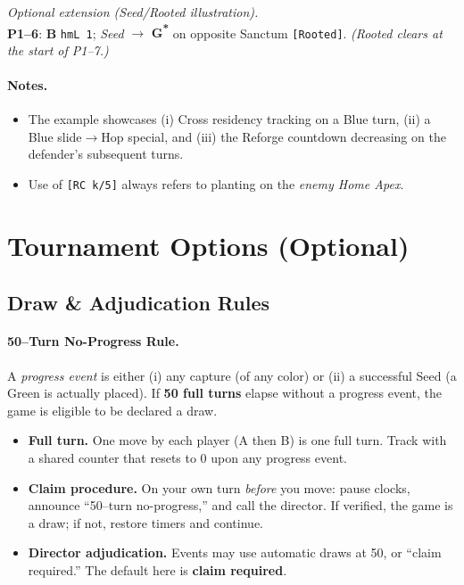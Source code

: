 \documentclass[11pt]{article}
\begin{document}
\noindent\emph{Optional extension (Seed/Rooted illustration).}\\
\textbf{P1--6}: \textbf{B} \texttt{hmL 1}; \emph{Seed} $\rightarrow$ \textbf{G\textsuperscript{*}} on opposite Sanctum \texttt{[Rooted]}. \emph{(Rooted clears at the start of P1--7.)}

\paragraph{Notes.}
\begin{itemize}
  \item The example showcases (i) Cross residency tracking on a Blue turn, (ii) a Blue slide$\rightarrow$Hop special, and (iii) the Reforge countdown decreasing on the defender's subsequent turns.
  \item Use of \texttt{[RC k/5]} always refers to planting on the \emph{enemy Home Apex}.
\end{itemize}

\section{Tournament Options (Optional)}
\label{sec:tournament-options}

\subsection{Draw \& Adjudication Rules}

\paragraph{50--Turn No-Progress Rule.}
A \emph{progress event} is either (i) any capture (of any color) or (ii) a successful Seed (a Green is actually placed). If \textbf{50 full turns} elapse without a progress event, the game is eligible to be declared a draw.

\begin{itemize}[leftmargin=1.3em,itemsep=0.2em]
  \item \textbf{Full turn.} One move by each player (A then B) is one full turn. Track with a shared counter that resets to 0 upon any progress event.
  \item \textbf{Claim procedure.} On your own turn \emph{before} you move: pause clocks, announce ``50--turn no-progress,'' and call the director. If verified, the game is a draw; if not, restore timers  and continue.
  \item \textbf{Director adjudication.} Events may use automatic draws at 50, or ``claim required.'' The default here is \textbf{claim required}.
\end{itemize}
\end{document}
